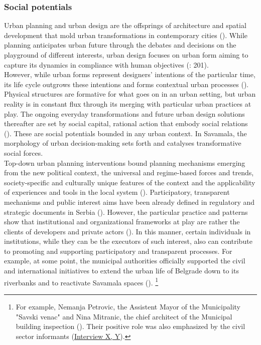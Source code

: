 \documentclass[11pt]{report}
\begin{document}
\subsubsection{Social potentials}

Urban planning and urban design are the offsprings of architecture and spatial development that mold urban transformations in contemporary cities (\href{ref}{\citealt{rode_city_2006}}).
While planning anticipates urban future through the debates and decisions on the playground of different interests, urban design focuses on urban form aiming to capture its dynamics in compliance with human objectives (\href{ref}{\citealt{lynch_theory_1958}}: 201).
\\

However, while urban forms represent designers' intentions of the particular time, its life cycle outgrows these intentions and forms contextual urban processes (\href{ref}{\citealt{tonkiss_cities_2014}}).
Physical structures are formative for what goes on in an urban setting, but urban reality is in constant flux through its merging with particular urban practices at play.
The ongoing everyday transformations and future urban design solutions thereafter are set by social capital, rational action that embody social relations (\href{ref}{\citealt{coleman_social_1988}}).
These are social potentials bounded in any urban context.
In Savamala, the morphology of urban decision-making sets forth and catalyses transformative social forces.
\\

Top-down urban planning interventions bound planning mechanisms emerging from the new political context, the universal and regime-based forces and trends, society-specific and culturally unique features of the context and the applicability of experiences and tools in the local system (\href{ref}{\citealt{nedovic-budic_adjustment_2001}}).
Participatory, transparent mechanisms and public interest aims have been already defined in regulatory and strategic documents in Serbia (\href{ref}{\citealt{vujosevic_conundrum_2012}}).
However, the particular practice and patterns show that institutional and organizational frameworks at play are rather the clients of developers and private actors (\href{ref}{\citealt{mrdjenovic_tatjana_urban_2015}}).
In this manner, certain individuals in institutions, while they can be the executors of such interest, also can contribute to promoting and supporting participatory and transparent processes.
For example, at some point, the municipal authorities officially supported the civil and international initiatives to extend the urban life of Belgrade down to its riverbanks and to reactivate Savamala spaces (\href{ref}{\citealt{doytchinov_urban_2015}}).
\footnote{For example, Nemanja Petrovic, the Assistent Mayor of the Municipality "Savski venac" and Nina Mitranic, the chief architect of the Municipal building inspection (\href{ref}{\citealt{doytchinov_urban_2015}}). Their positive role was also emphasized by the civil sector informants (\href{InterviewX}{Interview X, Y}).}
\\
\end{document}
